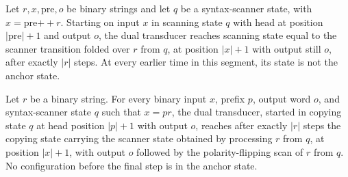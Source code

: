 \begin{lemma}
\label{Complexity.tautDual_scan}
\leanok
{}
Let $r,x,\mathrm{pre},o$ be binary strings and let $q$ be a syntax-scanner state, with
$x=\mathrm{pre}\mathbin{++}r$. Starting on input $x$ in scanning state $q$ with head
at position $|\mathrm{pre}|+1$ and output $o$, the dual transducer reaches scanning
state equal to the scanner transition folded over $r$ from $q$, at position $|x|+1$ with
output still $o$, after exactly $|r|$ steps. At every earlier time in this segment, its
state is not the anchor state.
\end{lemma}

\begin{lemma}
\label{Complexity.tautDual_copy}
\leanok
{}
Let $r$ be a binary string. For every binary input $x$, prefix $p$, output word $o$, and
syntax-scanner state $q$ such that $x=p r$, the dual transducer, started in copying
state $q$ at head position $|p|+1$ with output $o$, reaches after exactly $|r|$ steps
the copying state carrying the scanner state obtained by processing $r$ from $q$, at
position $|x|+1$, with output $o$ followed by the polarity-flipping scan of $r$ from
$q$. No configuration before the final step is in the anchor state.
\end{lemma}

